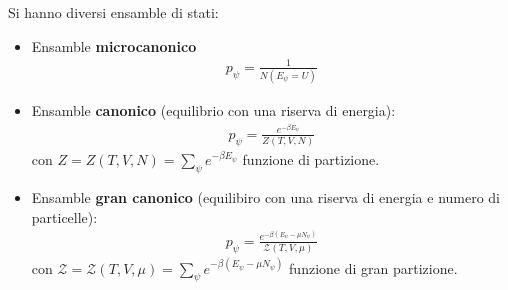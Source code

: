 Si hanno diversi ensamble di stati:
\begin{itemize}
\item Ensamble \textbf{microcanonico}
\begin{equation}\begin{split}
p_\psi =\frac{1}{N\left(E_\psi =U\right)}
\end{split}\end{equation}

\item Ensamble \textbf{canonico} (equilibrio con una riserva di energia):
\begin{equation}\begin{split}
p_\psi =\frac{e^{-\beta E_\psi }}{Z\left(T,V,N\right)}
\end{split}\end{equation}
con $Z=Z\left(T,V,N\right)=\sum_{\psi }{e^{-\beta E_\psi}}$ funzione di partizione.

\item Ensamble \textbf{gran canonico} (equilibiro con una riserva di energia e numero di particelle):
\begin{equation}\begin{split}
p_\psi =\frac{e^{-\beta \left(E_\psi -\mu N_\psi \right)}}{\mathcal{Z}\left(T,V,\mu\right)}
\end{split}\end{equation}
con $\mathcal{Z}=\mathcal{Z}\left(T,V,\mu\right)=\sum_{\psi }{e^{-\beta\left(E_\psi -\mu N_\psi \right)}}$ funzione di gran partizione.
\end{itemize}